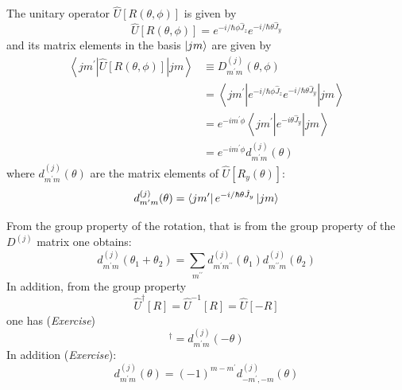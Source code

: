 \documentclass[12pt]{article}
\newcommand{\be}{\begin{equation}}
\newcommand{\ee}{\end{equation}}
\begin{document}

The unitary operator \(\hat{U}[R(\theta, \phi)]\) is given by
\be
\hat{U}[R(\theta, \phi)]=e^{-i/\hbar \phi \hat{J}_{z}} e^{-i/\hbar \theta \hat{J}_{y}}
\ee
and its matrix elements in the basis $\ket{jm}$ are given by
\be
\begin{aligned}
\left\langle j m^{\prime}|\hat{U}[R(\theta, \phi)]| j m\right\rangle 
& \equiv D_{m^{\prime} m}^{(j)}(\theta, \phi) \\ 
&=\left\langle j m^{\prime}\left|e^{-i/\hbar \phi \hat{J}_{z}} e^{-i/\hbar \theta \hat{J}_{y}}\right| j m\right\rangle \\ 
&=e^{-i m^{\prime} \phi}\left\langle j m^{\prime}\left|e^{-i \theta \hat{J}_{y}}\right| j m\right\rangle \\
&=e^{-i m^{\prime} \phi} d_{m^{\prime} m}^{(j)}(\theta)
\end{aligned}
\ee
where $d_{m^{\prime} m}^{(j)}(\theta)$ are the matrix elements of $\hat{U}[R_y(\theta)]$:
\be
d_{m^{\prime} m}^{(j)}(\theta) =
\bra{jm^\prime}
e^{-i/\hbar\theta\hat{J}_y}
\ket{jm}
\ee

From the group property of the rotation, that is from
the group property of the $D^{(j)}$ matrix one obtains:
\be
d_{m^{\prime} m}^{(j)}(\theta_1+\theta_2) =
\sum_{m^{\prime\prime}}
d_{m^{\prime} m^{\prime\prime}}^{(j)}(\theta_1)
d_{m^{\prime\prime} m}         ^{(j)}(\theta_2)
\ee
In addition, from the group property
\be
\hat{U}^\dagger[R] = \hat{U}^{-1}[R] = \hat{U}[-R] 
\ee
one has (\emph{Exercise})
\be
[d_{m^{\prime} m}^{(j)}(\theta)]^\dagger =
d_{m^{\prime} m}^{(j)}(-\theta)
\ee
In addition (\emph{Exercise}):
\be
d_{m^{\prime} m}^{(j)}(\theta) = (-1)^{m-m^\prime}
d_{-m^{\prime},-m}^{(j)}(\theta)
\ee

\end{document}
